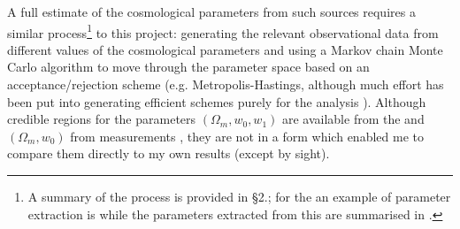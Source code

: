A full estimate of the cosmological parameters from such sources requires a similar process\footnote{A summary of the \bao{} process is provided in \cite{vanOsten2006}§2.; for the \cmb{} an example of parameter extraction is \cite{LewisBridle2002} while the parameters extracted from this are summarised in \cite{vanOsten2006,Carroll2001}.} to this project: generating the relevant observational data from different values of the cosmological parameters and using a Markov chain Monte Carlo algorithm to move through the parameter space based on an acceptance/rejection scheme (e.g. Metropolis-Hastings, although much effort has been put into generating efficient schemes purely for the \cmb{} analysis \cite{Christensen2001,Dunkley2005,LewisBridle2002} ). Although credible regions for the parameters $(\Omega_m , w_0 , w_1 )$ are available from the \cmb{} \cite{Spergel2007,Komatsu2010,Dunkley2009} and $(\Omega_m , w_0)$ from \bao{} measurements \cite{Eisenstein2005,Percival2007}, they are not in a form which enabled me to compare them directly to my own results (except by sight).

